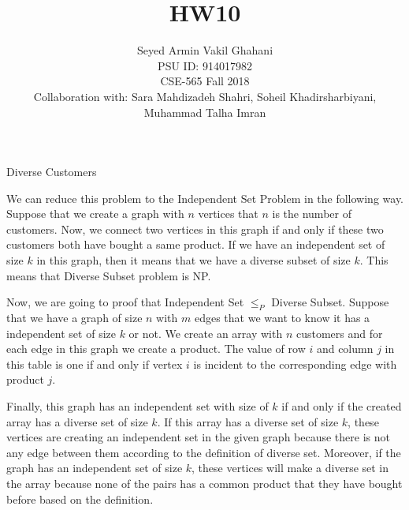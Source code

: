 \documentclass[12pt]{article}
\newenvironment{solution}[2][Solution]{\begin{trivlist}
\item[\hskip \labelsep {\bfseries #1}]}{\end{trivlist}}
\newenvironment{problem}[2][Problem]{\begin{trivlist}
\item[\hskip \labelsep {\bfseries #1}\hskip \labelsep {\bfseries #2.}]}{\end{trivlist}}
\begin{document}
 
\title{\textbf{HW10}}%
\author{Seyed Armin Vakil Ghahani\\ %
PSU ID: 914017982\\
CSE-565 Fall 2018\\
Collaboration with:
Sara Mahdizadeh Shahri, Soheil Khadirsharbiyani,\\
Muhammad Talha Imran} %
 
\maketitle
\begin{problem}{1}
Diverse Customers
\end{problem}

\begin{solution}{}
We can reduce this problem to the Independent Set Problem in the following way.
Suppose that we create a graph with $n$ vertices that $n$ is the number of customers.
Now, we connect two vertices in this graph if and only if these two customers
both have bought a same product. If we have an independent set of size $k$ in this graph,
then it means that we have a diverse subset of size $k$. This means that Diverse Subset 
problem is NP.

Now, we are going to proof that Independent Set $\leq _P$ Diverse Subset. Suppose that
we have a graph of size $n$ with $m$ edges that we want to know it has a independent set
of size $k$ or not. We create an array with $n$ customers and for each edge in this graph
we create a product. The value of row $i$ and column $j$ in this table is one if and only
if vertex $i$ is incident to the corresponding edge with product $j$.

Finally, this graph has an independent set with size of $k$ if and only if the created array
has a diverse set of size $k$. If this array has a diverse set of size $k$, these vertices
are creating an independent set in the given graph because there is not any edge between
them according to the definition of diverse set. Moreover, if the graph has an independent
set of size $k$, these vertices will make a diverse set in the array because none of the pairs
has a common product that they have bought before based on the definition.
\end{solution}
\end{document}
